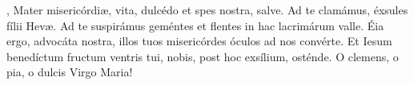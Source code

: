 , Mater misericórdi{\ae}, vita, dulcédo et spes nostra, salve. Ad te clamámus, éxsules fílii Hev{\ae}.
Ad te suspirámus geméntes et flentes in hac lacrimárum valle. Éia ergo, advocáta nostra, illos tuos misericórdes óculos ad nos convérte.
Et Iesum benedíctum fructum ventris tui, nobis, post hoc exsílium, osténde. O clemens, o pia, o dulcis Virgo Maria!